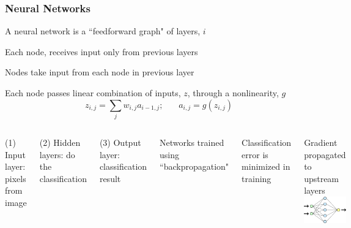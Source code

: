 \documentclass[10pt,professionalfonts,xcolor=table]{beamer}
\begin{document}
\begin{frame}
\frametitle{Neural Networks}

\bangon
\bang A neural network is a ``feedforward graph" of layers, $i$
  \bangon
  \item Each node,  receives input only from previous layers
  \item Nodes take input from each node in previous layer
  \item Each node passes linear combination of inputs, $z$, through a nonlinearity, $g$
  \bong \[ z_{i,j} = \sum_j w_{i,j} a_{i-1, j}; ~~~~~~~~ a_{i,j}  = g(z_{i,j}) \]
  \bangoff
\bangoff
\vspace{-10pt}
\begin{columns}[c]

  \bangon
  \item[(1)] Input layer: pixels from image
  \item[(2)] Hidden layers: do the classification
  \item[(3)] Output layer: classification result
  \gap
  \item Networks trained using ``backpropagation"
    \bangon
    \item Classification error is minimized in training
    \item Gradient propagated to upstream layers
    \bangoff
  \bangoff
{}
\centering
\includegraphics[width=1\textwidth]{figures/figures/basicNN.png}
\end{columns}


\end{frame}
\end{document}

